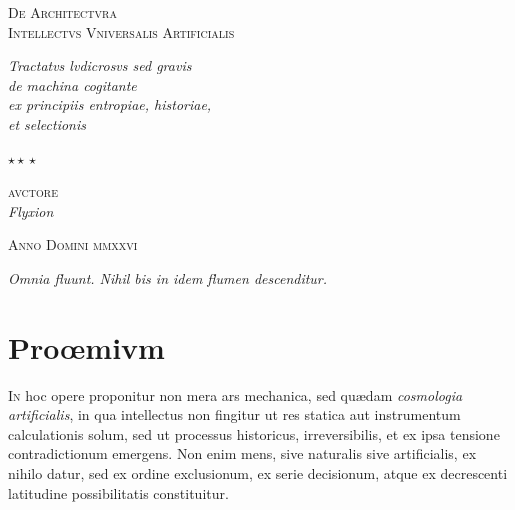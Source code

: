 \documentclass[12pt, oneside, openany]{memoir}
\newcommand{\rubric}[1]{{\color{rubricate}#1}}
\newcommand{\mytitlerule}{{\color{rubricate}\rule{\linewidth}{0.5pt}}}
\begin{document}
\thispagestyle{empty}
\vspace*{16mm}
\begin{center}
  {\color{rubricate}\scshape\Large
    De Architectvra\\[5pt]
    Intellectvs Vniversalis Artificialis}

  \bigskip\mytitlerule\bigskip

  {\itshape\normalsize
    Tractatvs lvdicrosvs sed gravis\\[3pt]
    de machina cogitante\\[3pt]
    ex principiis entropiae, historiae,\\[3pt]
    et selectionis}

  \vspace{14mm}
  {\color{capgold}\Large$\star\!\star\!\star$}
  \vspace{14mm}

  {\scshape\small avctore}\\[4pt]
  {\itshape\large Flyxion}

  \vspace{12mm}\mytitlerule\vspace{8mm}
  {\scriptsize\scshape\color{rubricate} Anno Domini \textsc{mmxxvi}}
\end{center}
\vfill
{\centering\color{rubricate}\footnotesize\itshape
  Omnia fluunt. Nihil bis in idem flumen descenditur.\par}
\clearpage

\chapter*{\rubric{Pro\oe{}mivm}}
\thispagestyle{fancy}

\lettrine[lines=3,findent=8pt,nindent=4pt]{I}{n} hoc opere proponitur non mera ars mechanica, sed qu\ae{}dam
\emph{cosmologia artificialis}, in qua intellectus non fingitur ut res statica
aut instrumentum calculationis solum, sed ut processus historicus,
irreversibilis, et ex ipsa tensione contradictionum emergens. Non enim mens,
sive naturalis sive artificialis, ex nihilo datur, sed ex ordine exclusionum,
ex serie decisionum, atque ex decrescenti latitudine possibilitatis
constituitur.
\end{document}
